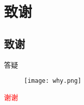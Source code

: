 \section{致谢}
\label{sec:bibliography}




\subsection{致谢}

\begin{frame}{答疑}
  \begin{figure}
    \centering
    \texttt{[image: why.png]}
  \end{figure}
\end{frame}

\begin{frame}{}
  \begin{center}
    \Huge{\textcolor{red}{谢谢}}
  \end{center}
\end{frame}
